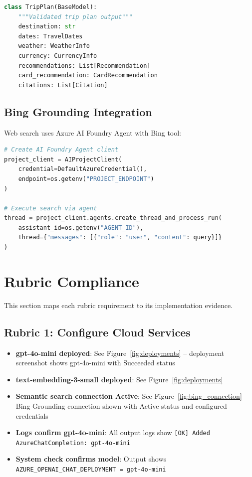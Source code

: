 \documentclass[11pt,a4paper]{article}
\begin{document}
\begin{lstlisting}[language=Python]
class TripPlan(BaseModel):
    """Validated trip plan output"""
    destination: str
    dates: TravelDates
    weather: WeatherInfo
    currency: CurrencyInfo
    recommendations: List[Recommendation]
    card_recommendation: CardRecommendation
    citations: List[Citation]
\end{lstlisting}

\subsection{Bing Grounding Integration}

Web search uses Azure AI Foundry Agent with Bing tool:

\begin{lstlisting}[language=Python]
# Create AI Foundry Agent client
project_client = AIProjectClient(
    credential=DefaultAzureCredential(),
    endpoint=os.getenv("PROJECT_ENDPOINT")
)

# Execute search via agent
thread = project_client.agents.create_thread_and_process_run(
    assistant_id=os.getenv("AGENT_ID"),
    thread={"messages": [{"role": "user", "content": query}]}
)
\end{lstlisting}

\newpage

\section{Rubric Compliance}

This section maps each rubric requirement to its implementation evidence.

\subsection{Rubric 1: Configure Cloud Services}

\begin{itemize}[noitemsep]
    \item \textbf{gpt-4o-mini deployed}: See Figure~\ref{fig:deployments} -- deployment screenshot shows gpt-4o-mini with Succeeded status
    \item \textbf{text-embedding-3-small deployed}: See Figure~\ref{fig:deployments}
    \item \textbf{Semantic search connection Active}: See Figure~\ref{fig:bing_connection} -- Bing Grounding connection shown with Active status and configured credentials
    \item \textbf{Logs confirm gpt-4o-mini}: All output logs show \texttt{[OK] Added AzureChatCompletion: gpt-4o-mini}
    \item \textbf{System check confirms model}: Output shows \texttt{AZURE\_OPENAI\_CHAT\_DEPLOYMENT = gpt-4o-mini}
\end{itemize}
\end{document}
